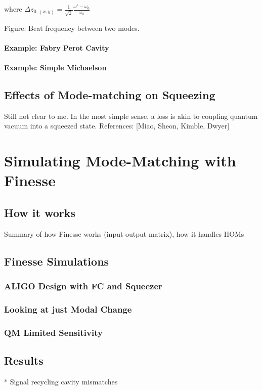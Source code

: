 \documentclass[oneside]{book}
\begin{document}
		where $\Delta z_{0,(x,y)} =   \frac{1}{\sqrt{2}} \frac{\omega'-\omega_{0}}{\omega_{0}} $

		Figure: Beat frequency between two modes.
		
		
		\subsubsection{Example: Fabry Perot Cavity}
		
		
		\subsubsection{Example: Simple Michaelson}
		


		\section{Effects of Mode-matching on Squeezing}
		Still not clear to me.
		In the most simple sense, a loss is akin to coupling quantum vacuum into a squeezed state.
		References: [Miao, Sheon, Kimble, Dwyer]
	
	
\chapter{Simulating Mode-Matching with Finesse}	
	\section{How it works}
	Summary of how Finesse works (input output matrix), how it handles HOMs
	\section{Finesse Simulations}
		\subsection{ALIGO Design with FC and Squeezer}
		\subsection{Looking at just Modal Change}
		\subsection{QM Limited Sensitivity}
			
	\section{Results}
		* Signal recycling cavity mismatches
\end{document}
